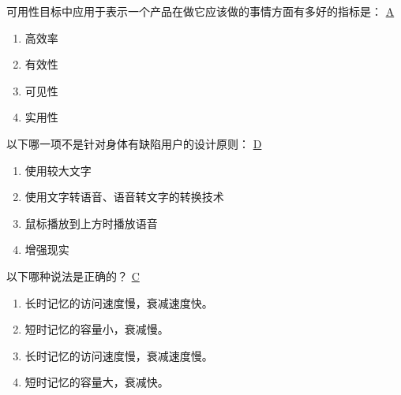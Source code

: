 \begin{problem}
	‍可用性目标中应用于表示一个产品在做它应该做的事情方面有多好的指标是：
	\uline{A}    
    \vspace{-0.8em}
    \begin{multicols}{4}
        \begin{enumerate}[label=\Alph*.]
            \item 高效率
            \item 有效性
            \item 可见性
            \item 实用性
        \end{enumerate}
    \end{multicols}
    \vspace{-1em}
\end{problem}



\begin{problem}
	‍以下哪一项不是针对身体有缺陷用户的设计原则：
	\uline{D}    
    \vspace{-0.8em}
    \begin{multicols}{2}
        \begin{enumerate}[label=\Alph*.]
            \item 使用较大文字
            \item 使用文字转语音、语音转文字的转换技术
            \item 鼠标播放到上方时播放语音
            \item 增强现实
        \end{enumerate}
    \end{multicols}
    \vspace{-1em}
\end{problem}



\begin{problem}
	‍以下哪种说法是正确的？
	\uline{C}    
    \vspace{-0.8em}
    \begin{multicols}{2}
        \begin{enumerate}[label=\Alph*.]
            \item 长时记忆的访问速度慢，衰减速度快。
            \item 短时记忆的容量小，衰减慢。
            \item 长时记忆的访问速度慢，衰减速度慢。
            \item 短时记忆的容量大，衰减快。
        \end{enumerate}
    \end{multicols}
    \vspace{-1em}
\end{problem}



